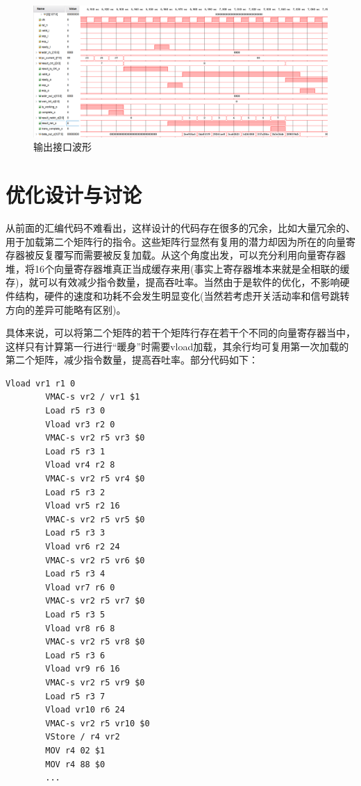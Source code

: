 \documentclass{article}
\begin{document}
\begin{figure}[!ht]
    \centering
    \includegraphics[width = \textwidth]{output_sim.png}
    \caption{输出接口波形}
\end{figure}


\FloatBarrier
\section{优化设计与讨论}
从前面的汇编代码不难看出，这样设计的代码存在很多的冗余，比如大量冗余的、用于加载第二个矩阵行的指令。这些矩阵行显然有复用的潜力却因为所在的向量寄存器被反复覆写而需要被反复加载。从这个角度出发，可以充分利用向量寄存器堆，将16个向量寄存器堆真正当成缓存来用(事实上寄存器堆本来就是全相联的缓存)，就可以有效减少指令数量，提高吞吐率。当然由于是软件的优化，不影响硬件结构，硬件的速度和功耗不会发生明显变化(当然若考虑开关活动率和信号跳转方向的差异可能略有区别)。

具体来说，可以将第二个矩阵的若干个矩阵行存在若干个不同的向量寄存器当中，这样只有计算第一行进行``暖身''时需要vload加载，其余行均可复用第一次加载的第二个矩阵，减少指令数量，提高吞吐率。部分代码如下：
\begin{lstlisting}[frame=lines]
        Vload vr1 r1 0
        VMAC-s vr2 / vr1 $1
        Load r5 r3 0
        Vload vr3 r2 0
        VMAC-s vr2 r5 vr3 $0
        Load r5 r3 1
        Vload vr4 r2 8
        VMAC-s vr2 r5 vr4 $0
        Load r5 r3 2
        Vload vr5 r2 16
        VMAC-s vr2 r5 vr5 $0
        Load r5 r3 3
        Vload vr6 r2 24
        VMAC-s vr2 r5 vr6 $0
        Load r5 r3 4
        Vload vr7 r6 0
        VMAC-s vr2 r5 vr7 $0
        Load r5 r3 5
        Vload vr8 r6 8
        VMAC-s vr2 r5 vr8 $0
        Load r5 r3 6
        Vload vr9 r6 16
        VMAC-s vr2 r5 vr9 $0
        Load r5 r3 7
        Vload vr10 r6 24
        VMAC-s vr2 r5 vr10 $0
        VStore / r4 vr2
        MOV r4 02 $1
        MOV r4 88 $0
        ...
    \end{lstlisting}
\end{document}
